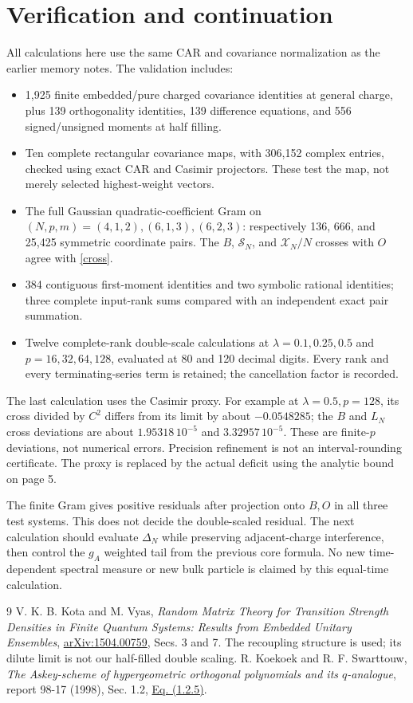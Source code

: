 \documentclass[11pt,a4paper]{article}
\begin{document}
\newpage
\section{Verification and continuation}
All calculations here use the same CAR and covariance normalization
as the earlier memory notes. The validation includes:
\begin{itemize}
 \item 1,925 finite embedded/pure charged covariance identities at
 general charge, plus 139 orthogonality identities, 139 difference
 equations, and 556 signed/unsigned moments at half filling.
 \item Ten complete rectangular covariance maps, with 306,152
 complex entries, checked using exact CAR and Casimir projectors.
 These test the map, not merely selected highest-weight vectors.
 \item The full Gaussian quadratic-coefficient Gram on
 $(N,p,m)=(4,1,2),(6,1,3),(6,2,3)$: respectively 136, 666, and
 25,425 symmetric coordinate pairs. The $B$, $\mathcal S_N$, and
 $\mathcal X_N/N$ crosses with $O$ agree with \eqref{cross}.
 \item 384 contiguous first-moment identities and two symbolic
 rational identities; three complete input-rank sums compared with
 an independent exact pair summation.
 \item Twelve complete-rank double-scale calculations at
 $\lambda=0.1,0.25,0.5$ and $p=16,32,64,128$, evaluated at 80 and
 120 decimal digits. Every rank and every terminating-series term
 is retained; the cancellation factor is recorded.
\end{itemize}
The last calculation uses the Casimir proxy. For example at
$\lambda=0.5,p=128$, its cross divided by $C^2$ differs from its
limit by about $-0.0548285$; the $B$ and $L_N$ cross deviations
are about $1.95318\,10^{-5}$ and $3.32957\,10^{-5}$.
These are finite-$p$ deviations, not numerical errors. Precision
refinement is not an interval-rounding certificate. The proxy is
replaced by the actual deficit using the analytic bound on page 5.

The finite Gram gives positive residuals after projection onto
$B,O$ in all three test systems. This does not decide the
double-scaled residual. The next calculation should evaluate
$\Delta_N$ while preserving adjacent-charge interference, then
control the $g_A$ weighted tail from the previous core formula.
No new time-dependent spectral measure or new bulk particle is
claimed by this equal-time calculation.

\begin{thebibliography}{9}
 V. K. B. Kota and M. Vyas,
\emph{Random Matrix Theory for Transition Strength Densities in
Finite Quantum Systems: Results from Embedded Unitary Ensembles},
\href{https://arxiv.org/abs/1504.00759}{arXiv:1504.00759},
Secs. 3 and 7. The recoupling structure is used; its dilute limit
is not our half-filled double scaling.
 R. Koekoek and R. F. Swarttouw,
\emph{The Askey-scheme of hypergeometric orthogonal polynomials
and its $q$-analogue}, report 98-17 (1998), Sec. 1.2,
\href{https://tudelft.roelofkoekoek.nl/documents/as98.pdf}{Eq. (1.2.5)}.
\end{thebibliography}
\end{document}
